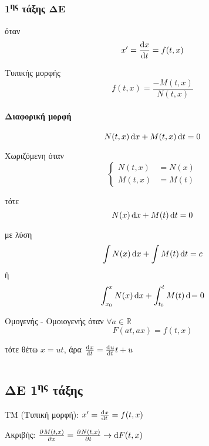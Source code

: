 \documentclass[11pt,a4paper,titlepage,final]{article}
\begin{document}
\subsubsection{1\textsuperscript{ης} τάξης ΔΕ}
\begin{defn}{}{}
όταν
\[
x' = \frac{\dif x}{\dif t} = f(t,x)
\]

\begin{defn}{Τυπικής μορφής}{}
\[
f(t,x) = \frac{-M(t,x)}{N(t,x)}
\]

\paragraph{Διαφορική μορφή}
\[N(t,x) \dif x + M(t,x) \dif t = 0 \]

\begin{defn}{Χωριζόμενη}{}
όταν
\[
\begin{cases}
N(t,x) &= N(x) \\
M(t,x) &= M(t)
\end{cases}
\]

τότε
\[
N(x) \dif x + M(t) \dif t = 0
\]

με λύση
\[
\int N(x) \dif x + \int M(t) \dif t = c
\]
ή
\[
\int_{x_0}^x N(x) \dif x + \int_{t_0}^t M(t) \dif = 0
\]
\end{defn}

\begin{defn}{Ομογενής - Ομοιογενής}{}
όταν \(\forall a \in  \mathbb R\)
\[
F(at,ax)=f(t,x)
\]

τότε θέτω \(x = ut\), άρα \(\od{x}{t}=\od{u}{t}t+u\)
\end{defn}


\end{defn}
\end{defn}


\section{}





\subsection{ΔΕ 1\textsuperscript{ης} τάξης}
ΤΜ (Τυπική μορφή): \(x' = \od{x}{t} = f(t,x)\)


Ακριβής: \(
\pd{M(t,x)}{x}=\pd{N(t,x)}{t} \rightarrow \dif F(t,x)
\)
\end{document}
